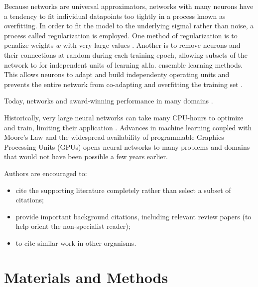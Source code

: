 \documentclass[9pt,twocolumn,twoside]{g3_article/gsag3jnl}
\begin{document}
Because networks are universal approximators, networks with many
neurons have a tendency to fit individual datapoints too tightly 
in a process known as overfitting. In order to fit the model to the underlying
sigmal rather than noise, a process called regularization is employed. One method
of regularization is to penalize weights $w$ with very large values \citep{krogh1992}. 
Another is to remove neurons and their connections at random during each training
epoch, allowing subsets of the network to for independent units of learning al.la. ensemble learning methods.  
This allows neurons to adapt and build independenty operating units and prevents the entire
network from co-adapting and overfitting the training set \citep{srivastava2014}.

Today, networks and award-winning performance in many domains \citep{schmidhuber2015}.

Historically, very large neural networks can take many CPU-hours to optimize and 
train, limiting their application \citep{gonzalez-recio2014}. 
Advances in machine 
learning coupled with Moore's Law and the widespread availability of programmable 
Graphics Processing Units (GPUs) opens neural networks to many problems and 
domains that would not have been possible a few years earlier. 


Authors are encouraged to:

\begin{itemize}
\item cite the supporting literature completely rather than select a subset of citations;
\item provide important background citations, including relevant review papers (to help orient the non-specialist reader);
\item to cite similar work in other organisms.
\end{itemize}

\section*{Materials and Methods}
\end{document}
